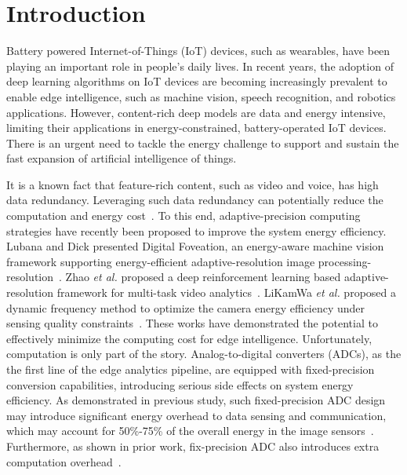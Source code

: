 \section{Introduction}

Battery powered Internet-of-Things (IoT) devices, such as wearables, have been playing an important role in people's daily lives.
In recent years, the adoption of deep learning algorithms on IoT devices are becoming increasingly prevalent to enable edge
intelligence, such as machine vision, speech recognition, and robotics applications. However, content-rich deep models are data 
and energy intensive, limiting their applications in energy-constrained, battery-operated IoT devices. There is an urgent need to 
tackle the energy challenge to support and sustain the fast expansion of artificial intelligence of things.

It is a known fact that feature-rich content, such as video and voice, has high data redundancy. Leveraging such data redundancy
can potentially reduce the computation and energy cost~\cite{lubana_digital_2018, zhao_reinforcement-learning-based_2022}. 
To this end, adaptive-precision computing strategies have recently been proposed to improve the system energy efficiency. 
Lubana and Dick presented Digital Foveation, an energy-aware machine vision framework supporting energy-efficient adaptive-resolution image processing-resolution~\cite{lubana_digital_2018}. 
Zhao {\it et al.} proposed a deep reinforcement learning based adaptive-resolution framework for multi-task video analytics~\cite{zhao_reinforcement-learning-based_2022}. 
LiKamWa {\it et al.} proposed a dynamic frequency method to optimize the camera energy efficiency under sensing quality constraints~\cite{likamwa_energy_2013}. These works have demonstrated the potential to effectively minimize the computing cost for edge intelligence. 
Unfortunately, computation is only part of the story. Analog-to-digital converters (ADCs), as the the first line of the edge 
analytics pipeline, are equipped with fixed-precision conversion capabilities, introducing serious side effects on system energy 
efficiency.  As demonstrated in previous study, such fixed-precision ADC design may introduce significant energy overhead to 
data sensing and communication, which may account for 50\%-75\% of the overall energy in the image 
sensors~\cite{choi_energyillumination-adaptive_2015,takayanagi_125-inch_2005,kitamura_33-megapixel_2012}. Furthermore, as shown in 
prior work, fix-precision ADC also introduces extra computation overhead~\cite{likamwa_redeye_2016, lubana_digital_2018}. 

